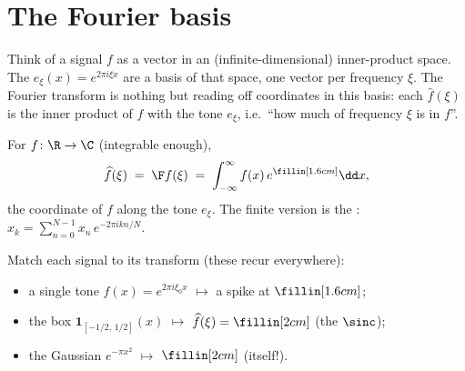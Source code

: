 \section{The Fourier basis}\label{sec:basis}
\quad{}

\begin{strand}
Think of a signal $f$ as a vector in an (infinite-dimensional) inner-product space. The
 $e_\xi(x)=e^{2\pi i\xi x}$ are a basis of that space, one vector per frequency
$\xi$. The Fourier transform is nothing but reading off coordinates in this basis: each
$\widehat f(\xi)$ is the inner product of $f$ with the tone $e_\xi$, i.e.\ ``how much of frequency
$\xi$ is in $f$''.
\end{strand}


\begin{definition}\label{def:ft}
For $f\colon\R\to\C$ (integrable enough),
\[
  \widehat f(\xi)\;=\;\F f(\xi)\;=\;\int_{-\infty}^{\infty} f(x)\,e^{\fillin[1.6cm]}\dd x ,
\]
the coordinate of $f$ along the tone $e_\xi$. The finite version is the :
$\widehat x_k=\sum_{n=0}^{N-1} x_n\,e^{-2\pi i kn/N}$.
\end{definition}


\begin{yourturn}
Match each signal to its transform (these recur everywhere):
\begin{itemize}[leftmargin=1.3em,itemsep=1pt]
  \item a single tone $f(x)=e^{2\pi i\xi_0 x}$ \;$\longmapsto$\; a spike at $\fillin[1.6cm]$;
  \item the box $\mathbf 1_{[-1/2,\,1/2]}(x)$ \;$\longmapsto$\; $\widehat f(\xi)=\fillin[2cm]$ (the $\sinc$);
  \item the Gaussian $e^{-\pi x^2}$ \;$\longmapsto$\; $\fillin[2cm]$ (itself!).
\end{itemize}
\end{yourturn}

